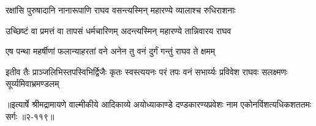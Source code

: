 \twolineshloka
{रक्षांसि पुरुषादानि नानारूपाणि राघव}
{वसन्त्यस्मिन् महारण्ये व्यालाश्च रुधिराशनाः} %

\twolineshloka
{उच्छिष्टं वा प्रमत्तं वा तापसं धर्मचारिणम्}
{अदन्त्यस्मिन् महारण्ये तान्निवारय राघव} %

\twolineshloka
{एष पन्था महर्षीणां फलान्याहरतां वने}
{अनेन तु वनं दुर्गं गन्तुं राघव ते क्षमम्} %

\twolineshloka
{इतीव तैः प्राञ्जलिभिस्तपस्विभिर्द्विजैः कृतः स्वस्त्ययनः परं तपः}
{वनं सभार्य्यः प्रविवेश राघवः सलक्ष्मणः सूर्य्यमिवाभ्रमण्डलम्} %


॥इत्यार्षे श्रीमद्रामायणे वाल्मीकीये आदिकाव्ये अयोध्याकाण्डे दण्डकारण्यप्रवेशः नाम एकोनविंशत्यधिकशततमः सर्गः ॥२-११९॥
